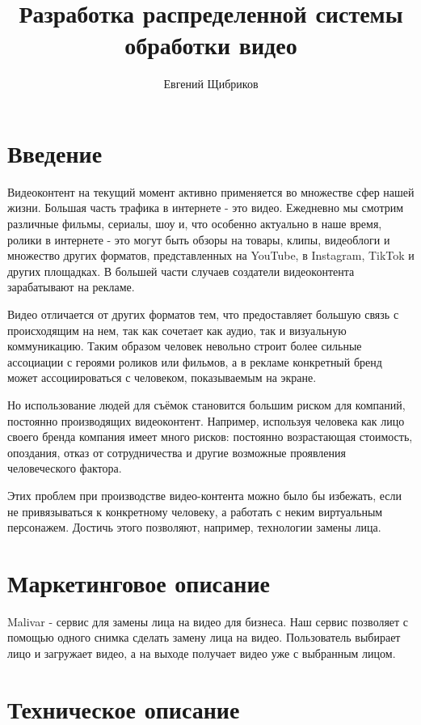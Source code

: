 

\title{Разработка распределенной системы обработки видео}
\author{Евгений Щибриков}



\section{Введение}

Видеоконтент на текущий момент активно применяется во множестве сфер нашей жизни. Большая часть трафика в интернете - это видео. Ежедневно мы смотрим различные фильмы, сериалы, шоу и, что особенно актуально в наше время, ролики в интернете - это могут быть обзоры на товары, клипы, видеоблоги и множество других форматов, представленных на YouTube, в Instagram, TikTok и других площадках. В большей части случаев создатели видеоконтента зарабатывают на рекламе.

Видео отличается от других форматов тем, что предоставляет большую связь с происходящим на нем, так как сочетает как аудио, так и визуальную коммуникацию. Таким образом человек невольно строит более сильные ассоциации с героями роликов или фильмов, а в рекламе конкретный бренд может ассоциироваться с человеком, показываемым на экране.

Но использование людей для съёмок становится большим риском для компаний, постоянно производящих видеоконтент. Например, используя человека как лицо своего бренда компания имеет много рисков: постоянно возрастающая стоимость, опоздания, отказ от сотрудничества и другие возможные проявления человеческого фактора.

Этих проблем при производстве видео-контента можно было бы избежать, если не привязываться к конкретному человеку, а работать с неким виртуальным персонажем. Достичь этого позволяют, например, технологии замены лица.

	

\section{Маркетинговое описание}

Malivar - сервис для замены лица на видео для бизнеса. 
Наш сервис позволяет с помощью одного снимка сделать замену лица на видео. Пользователь выбирает лицо и загружает видео, а на выходе получает видео уже с выбранным лицом.

\section{Техническое описание}

